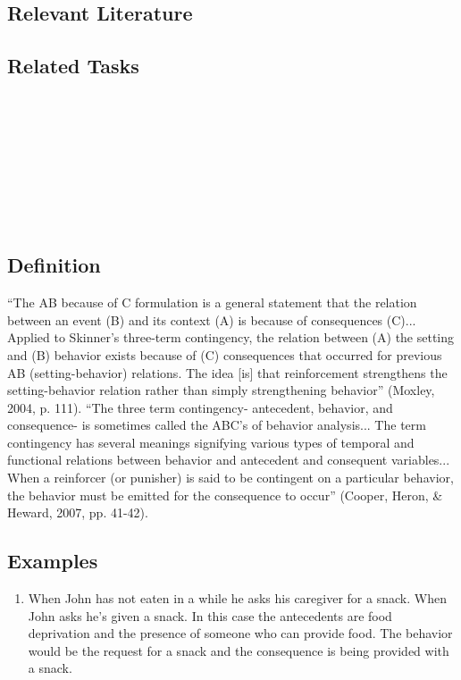 \subsection{Relevant Literature}
\begin{refsection}
\nocite{ayllon1968token,
        baer1999plan,
        cooper2007applied,
        snell2006instruction,
        stokes1977implicit,
        stokes1989operant}
\printbibliography[heading=none]
\end{refsection}
%
\subsection{Related Tasks}
\fourgEight{}\\
\fourjSeven{}\\
\fourjEight{}\\
\fourjEleven{}\\
\fourjTwelve{}\\
\fourkSeven{}\\
\fourkNine{}\\
%
\clearpage \section{\fourFKThirtyOne{}}
\subsection{Definition}
``The AB because of C formulation is a general statement that the relation between an event (B) and its context (A) is because of consequences (C)... Applied to Skinner's three-term contingency, the relation between (A) the setting and (B) behavior exists because of (C) consequences that occurred for previous AB (setting-behavior) relations. The idea [is] that reinforcement strengthens the setting-behavior relation rather than simply strengthening behavior'' (Moxley, 2004, p. 111).
``The three term contingency- antecedent, behavior, and consequence- is sometimes called the ABC's of behavior analysis... The term contingency has several meanings signifying various types of temporal and functional relations between behavior and antecedent and consequent variables... When a reinforcer (or punisher) is said to be contingent on a particular behavior, the behavior must be emitted for the consequence to occur'' (Cooper, Heron, \& Heward, 2007, pp. 41-42).
%
\subsection{Examples}
\begin{enumerate}
\item When John has not eaten in a while he asks his caregiver for a snack. When John asks he's given a snack. In this case the antecedents are food deprivation and the presence of someone who can provide food. The behavior would be the request for a snack and the consequence is being provided with a snack.
%
\end{enumerate}
%
